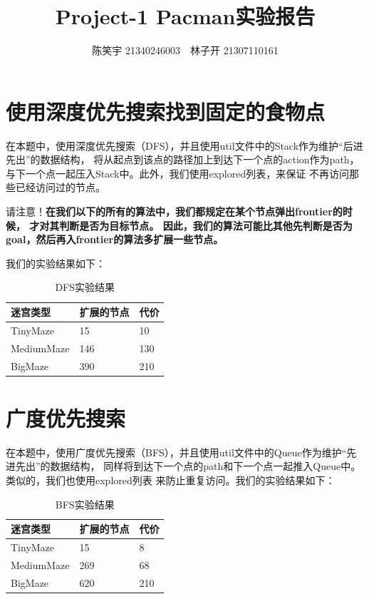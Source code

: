 \documentclass{article}
\title{Project-1 Pacman实验报告}
\author{陈笑宇 21340246003$\quad$林子开 21307110161}
\date{}
\begin{document}
	\maketitle
	\tableofcontents

\section{使用深度优先搜索找到固定的食物点}
在本题中，使用深度优先搜索（DFS），并且使用util文件中的Stack作为维护“后进先出”的数据结构，
将从起点到该点的路径加上到达下一个点的action作为path，
与下一个点一起压入Stack中。此外，我们使用explored列表，来保证
不再访问那些已经访问过的节点。

请注意！\textbf{在我们以下的所有的算法中，我们都规定在某个节点弹出frontier的时候，
才对其判断是否为目标节点。
因此，我们的算法可能比其他先判断是否为goal，然后再入frontier的算法多扩展一些节点。}

我们的实验结果如下：

\begin{table}[H]
	\centering
	\caption{DFS实验结果}
	\begin{tabular}{lll}
	\hline
	迷宫类型       & 扩展的节点 & 代价  \\
	\hline
	TinyMaze   & 15    & 10  \\
	MediumMaze & 146   & 130 \\
	BigMaze    & 390   & 210\\
	\hline
	\end{tabular}
	\end{table}

\section{广度优先搜索}
在本题中，使用广度优先搜索（BFS），并且使用util文件中的Queue作为维护“先进先出”的数据结构，
同样将到达下一个点的path和下一个点一起推入Queue中。类似的，我们也使用explored列表
来防止重复访问。我们的实验结果如下：
\begin{table}[H]
	\centering
	\caption{BFS实验结果}
	\begin{tabular}{lll}
		\hline
	迷宫类型       & 扩展的节点 & 代价  \\ \hline
	TinyMaze   & 15    & 8   \\
	MediumMaze & 269   & 68  \\
	BigMaze    & 620   & 210 \\ \hline
	\end{tabular}
	\end{table}
\end{document}

